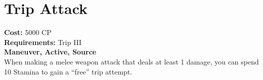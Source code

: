 \section{Trip Attack}
\textbf{Cost:} 5000 CP\\
\textbf{Requirements:} Trip III\\
\textbf{Maneuver, Active, Source}\\
When making a melee weapon attack that deals at least 1 damage, you can spend 10 Stamina to gain a “free” trip attempt.\\
